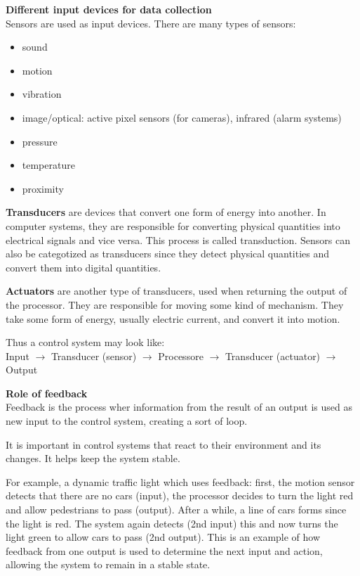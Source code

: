 \documentclass{article}
\begin{document}
\textbf{Different input devices for data collection} \\
Sensors are used as input devices. There are many types of sensors:
\begin{itemize}
    \item sound
    \item motion
    \item vibration
    \item image/optical: active pixel sensors (for cameras), infrared (alarm
        systems)
    \item pressure
    \item temperature
    \item proximity
\end{itemize}

\textbf{Transducers} are devices that convert one form of energy into another.
In computer systems, they are responsible for converting physical quantities
into electrical signals and vice versa. This process is called transduction.
Sensors can also be categotized as transducers since they detect physical
quantities and convert them into digital quantities.

\textbf{Actuators} are another type of transducers, used when returning the
output of the processor. They are responsible for moving some kind of
mechanism. They take some form of energy, usually electric current, and convert
it into motion.

Thus a control system may look like: \\
Input $\rightarrow$ Transducer (sensor) $\rightarrow$ Processore $\rightarrow$
Transducer (actuator) $\rightarrow$ Output

\textbf{Role of feedback} \\
Feedback is the process wher information from the result of an output is used
as new input to the control system, creating a sort of loop.

It is important in control systems that react to their environment and its
changes. It helps keep the system stable.

For example, a dynamic traffic light which uses feedback: first, the motion
sensor detects that there are no cars (input), the processor decides to turn
the light red and allow pedestrians to pass (output). After a while, a line of
cars forms since the light is red. The system again detects (2nd input) this
and now turns the light green to allow cars to pass (2nd output). This is an
example of how feedback from one output is used to determine the next input
and action, allowing the system to remain in a stable state.
\end{document}
